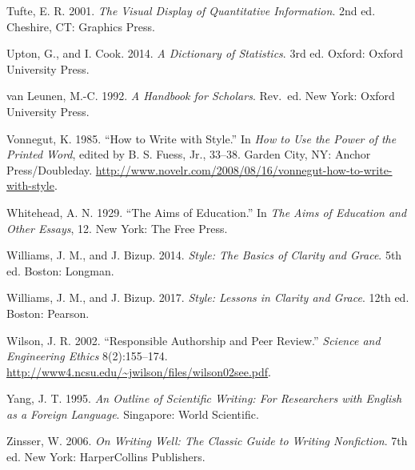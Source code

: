 \documentclass{wscpaperproc}
\theoremstyle{wsc}
\begin{document}
\begin{hangref}
\item
Tufte, E. R\@.  2001.  {\em The Visual Display of Quantitative Information}.
2nd ed.  Cheshire, CT: Graphics Press.


\item
Upton, G., and I. Cook.  2014.  \textit{A Dictionary of
Statistics}.  3rd ed.  Oxford: Oxford University Press.


\item
van Leunen, M.-C\@.  1992.  \textit{A Handbook for Scholars}.  Rev.\ ed.
New York: Oxford University Press.


\item
Vonnegut, K\@.  1985.  ``How to Write with Style.''  In \textit{How to Use
the Power of the Printed Word}, edited by B. S. Fuess, Jr., 33--38.
Garden City, NY: Anchor Press/Doubleday.  
\href{http://www.novelr.com/2008/08/16/vonnegut-how-to-write-with-style}{%
\url{http://www.novelr.com/2008/08/16/vonnegut-how-to-write-with-style}}\textcolor{black}{.}





\item
Whitehead, A. N\@.  1929.  ``The Aims of Education.''  In \textit{The Aims of
Education and Other Essays}, 12.  New York: The Free Press.

\item
Williams, J. M., and J. Bizup.  2014.  \textit{Style: The Basics of Clarity and
Grace}.  5th ed.  Boston: Longman. 


\item
Williams, J. M., and J. Bizup.  2017.  {\it Style: Lessons in Clarity and Grace}.
12th ed.  Boston: Pearson.

\item%
Wilson, J. R\@.  2002.  ``Responsible Authorship and Peer Review.''
\textit{Science and Engineering Ethics} 8(2):155--174.  
\href{http://www4.ncsu.edu/~jwilson/files/wilson02see.pdf}%
{\url{http://www4.ncsu.edu/~jwilson/files/wilson02see.pdf}}\textcolor{black}{.}


\item
Yang, J. T\@.  1995.  \textit{An Outline of Scientific Writing: For
Researchers with English as a Foreign Language}.  Singapore: World
Scientific.  

\item
Zinsser, W\@.  2006.  {\it On Writing Well: The Classic Guide to Writing
Nonfiction}.  7th ed.  New York: HarperCollins Publishers.
\end{hangref}
\end{document}

